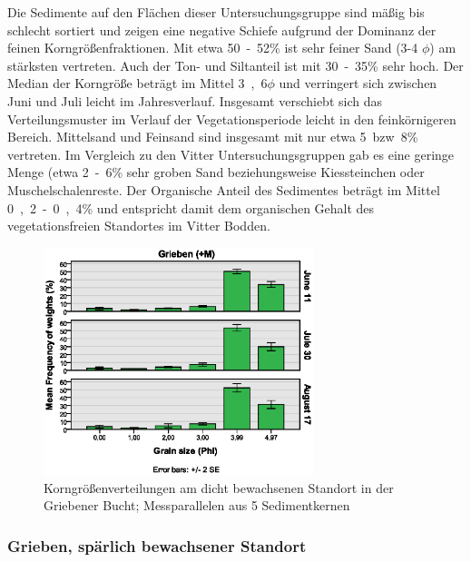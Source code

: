 Die Sedimente auf den Flächen dieser Untersuchungsgruppe sind mäßig bis schlecht sortiert und zeigen eine negative Schiefe aufgrund der Dominanz der feinen Korngrößenfraktionen. Mit etwa \unit{50-52}{\%} ist sehr feiner Sand (3-4 $\phi$) am stärksten vertreten. Auch der Ton- und Siltanteil ist mit \unit{30-35}{\%} sehr hoch. Der Median der Korngröße beträgt im Mittel \unit{3,6}{$\phi$} und verringert sich zwischen Juni und Juli leicht im Jahresverlauf. Insgesamt verschiebt sich das Verteilungsmuster im Verlauf der Vegetationsperiode leicht in den feinkörnigeren Bereich. Mittelsand und Feinsand sind insgesamt mit nur etwa \unit{5 bzw 8}{\%} vertreten. Im Vergleich zu den Vitter Untersuchungsgruppen gab es eine geringe Menge (etwa \unit{2-6}{\%} sehr groben Sand beziehungsweise Kiessteinchen oder Muschelschalenreste. 
Der Organische Anteil des Sedimentes beträgt im Mittel \unit{0,2-0,4}{\%} und entspricht damit dem organischen Gehalt des vegetationsfreien Standortes im Vitter Bodden.



\begin{figure}[!htb]
\centering
\includegraphics[width=0.70\textwidth]{images/grainsize/sediment_im_jahr3.eps}
\caption[Korngrößenverteilungen Grieben (+M)]{Korngrößenverteilungen am dicht bewachsenen Standort in der Griebener Bucht; Messparallelen aus 5 Sedimentkernen}
\label{fig:korngrössen_Grieben_+m}
\end{figure}




\subsubsection{Grieben, spärlich bewachsener Standort}

